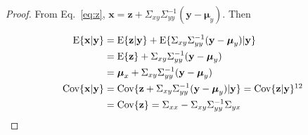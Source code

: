 \begin{proof}
    From Eq.~\ref{eq:z},
    $\mathbf{x}=\mathbf{z}+\Sigma_{xy}\Sigma_{yy}^{-1}(\mathbf{y}-\boldsymbol{\mu}_y)$.
    Then

    \begin{align}
        \text{E}\{\mathbf{x}|\mathbf{y}\}&=\text{E}\{\mathbf{z}|\mathbf{y}\}+\text{E}\{\Sigma_{xy}\Sigma_{yy}^{-1}(\mathbf{y}-\boldsymbol{\mu}_y)|\mathbf{y}\}\nonumber\\
                                         &=\text{E}\{\mathbf{z}\}+\Sigma_{xy}\Sigma_{yy}^{-1}(\mathbf{y}-\boldsymbol{\mu}_y)\nonumber\\
                                         &=\boldsymbol{\mu}_x+\Sigma_{xy}\Sigma_{yy}^{-1}(\mathbf{y}-\boldsymbol{\mu}_y)\nonumber\\
        \text{Cov}\{\mathbf{x}|\mathbf{y}\}&=\text{Cov}\{\mathbf{z}+\Sigma_{xy}\Sigma_{yy}^{-1}(\mathbf{y}-\boldsymbol{\mu}_y)|\mathbf{y}\}=\text{Cov}\{\mathbf{z}|\mathbf{y}\}\footnotemark[12]\\
                                           &=\text{Cov}\{\mathbf{z}\}=\Sigma_{xx}-\Sigma_{xy}\Sigma_{yy}^{-1}\Sigma_{yx}\nonumber
    \end{align}
\end{proof}
